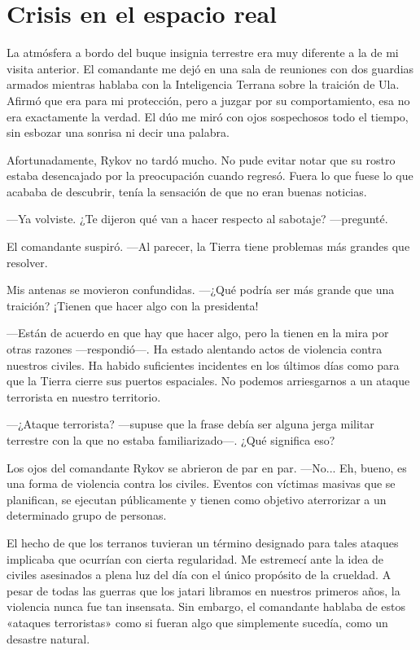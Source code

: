 \chapter{Crisis en el espacio real}\label{sec:crisis-en-el-espacio-real}

La atmósfera a bordo del buque insignia terrestre era muy diferente a la de mi visita anterior. El comandante me dejó en una sala de reuniones con dos guardias armados mientras hablaba con la Inteligencia Terrana sobre la traición de Ula. Afirmó que era para mi protección, pero a juzgar por su comportamiento, esa no era exactamente la verdad. El dúo me miró con ojos sospechosos todo el tiempo, sin esbozar una sonrisa ni decir una palabra.

Afortunadamente, Rykov no tardó mucho. No pude evitar notar que su rostro estaba desencajado por la preocupación cuando regresó. Fuera lo que fuese lo que acababa de descubrir, tenía la sensación de que no eran buenas noticias.

—Ya volviste. ¿Te dijeron qué van a hacer respecto al sabotaje? —pregunté.

El comandante suspiró. —Al parecer, la Tierra tiene problemas más grandes que resolver.

Mis antenas se movieron confundidas. —¿Qué podría ser más grande que una traición? ¡Tienen que hacer algo con la presidenta!

—Están de acuerdo en que hay que hacer algo, pero la tienen en la mira por otras razones —respondió—. Ha estado alentando actos de violencia contra nuestros civiles. Ha habido suficientes incidentes en los últimos días como para que la Tierra cierre sus puertos espaciales. No podemos arriesgarnos a un ataque terrorista en nuestro territorio.

 —¿Ataque terrorista? —supuse que la frase debía ser alguna jerga militar terrestre con la que no estaba familiarizado—. ¿Qué significa eso?

Los ojos del comandante Rykov se abrieron de par en par. —No... Eh, bueno, es una forma de violencia contra los civiles. Eventos con víctimas masivas que se planifican, se ejecutan públicamente y tienen como objetivo aterrorizar a un determinado grupo de personas.

El hecho de que los terranos tuvieran un término designado para tales ataques implicaba que ocurrían con cierta regularidad. Me estremecí ante la idea de civiles asesinados a plena luz del día con el único propósito de la crueldad. A pesar de todas las guerras que los jatari libramos en nuestros primeros años, la violencia nunca fue tan insensata. Sin embargo, el comandante hablaba de estos «ataques terroristas» como si fueran algo que simplemente sucedía, como un desastre natural.

